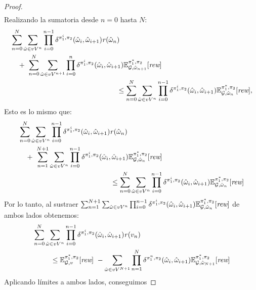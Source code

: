 \begin{proof}
\begin{align*}
  \end{align*}
  Realizando la sumatoria desde $n=0$ hasta $N$:
  \begin{align*}
    & \sum^{N}_{n=0}\sum_{\hat{\omega} \in vV^{n}} \prod^{n-1}_{i=0}\delta^{\strat{1}^i,\strat{2}}(\hat{\omega}_i,\hat{\omega}_{i+1}) \reward(\hat{\omega}_n) \\
    & \quad + \ \sum^{N}_{n=0} \sum_{\hat{\omega} \in vV^{n+1}} \prod^{n}_{i=0}\delta^{\strat{1}^i,\strat{2}}(\hat{\omega}_i,\hat{\omega}_{i+1})  \Expect{\starredstrat{1}}{\strat{2}}_{\StochG,\hat{\omega}_{n+1}}[\Rewards] \\
    & \hspace{15em} \leq 
	\sum^{N}_{n=0}
	\sum_{\hat{\omega} \in vV^{n}} \prod^{n-1}_{i=0}\delta^{\strat{1}^i,\strat{2}}(\hat{\omega}_i, \hat{\omega}_{i+1}) \Expect{\starredstrat{1}}{\strat{2}}_{\StochG,\hat{\omega}_n}[\Rewards],
  \end{align*}
  Esto es lo mismo que:
  \begin{align*}
    & \sum^{N}_{n=0}\sum_{\hat{\omega} \in vV^{n}} \prod^{n-1}_{i=0}\delta^{\strat{1}^i,\strat{2}}(\hat{\omega}_i,\hat{\omega}_{i+1}) \reward(\hat{\omega}_n) \\
    & \quad + \
	\sum^{N+1}_{n=1} \sum_{\hat{\omega} \in vV^{n}} \prod^{n-1}_{i=0}\delta^{\strat{1}^i,\strat{2}}(\hat{\omega}_i,\hat{\omega}_{i+1})  \Expect{\starredstrat{1}}{\strat{2}}_{\StochG,\hat{\omega}_{n}}[\Rewards] \\
    & \hspace{13em} \leq 
	 \sum^{N}_{n=0}
	\sum_{\hat{\omega} \in vV^{n}} \prod^{n-1}_{i=0}\delta^{\strat{1}^i,\strat{2}}(\hat{\omega}_i, \hat{\omega}_{i+1}) \Expect{\starredstrat{1}}{\strat{2}}_{\StochG,\hat{\omega}_n}[\Rewards]
  \end{align*}
  Por lo tanto, al sustraer $\sum^{N+1}_{n=1} \sum_{\hat{\omega} \in vV^{n}} \prod^{n-1}_{i=0}\delta^{\pi_{1}^i,\pi_{2}}(\hat{\omega}_i,\hat{\omega}_{i+1})  \mathbb{E}^{\pi^*_{1}, \pi_{2}}_{\mathcal{G},\hat{\omega}_{n}}[\textit{rew}]$ de ambos lados obtenemos:
  \begin{align*}
    & \sum^{N}_{n=0}\sum_{\hat{\omega} \in vV^{n}} \prod^{n-1}_{i=0}\delta^{\pi_{1}^i,\pi_{2}}(\hat{\omega}_i, \hat{\omega}_{i+1}) \mathit{r}(v_n)\\
    & \hspace{2.5em} \leq 
      \mathbb{E}^{\pi^*_{1}, \pi_{2}}_{\mathcal{G},v}[\textit{rew}] \ - \sum_{\hat{\omega} \in vV^{N+1}}\prod^{N}_{n=1}\delta^{\pi_{1}^n,\pi_{2}}(\hat{\omega}_i,\hat{\omega}_{i+1}) \mathbb{E}^{\pi^*_{1}, \pi_{2}}_{\mathcal{G}, \hat{\omega}_{N+1}}[\textit{rew}]
  \end{align*}
  Aplicando límites a ambos lados, conseguimos


\end{proof}
